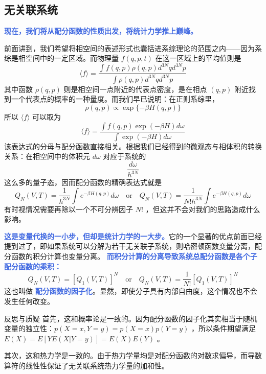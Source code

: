\subsection{无关联系统}
\textcolor{RoyalBlue}{\textbf{\kaishu 现在，我们将从配分函数的性质出发，将统计力学推上巅峰。}}

前面讲到，我们希望将相空间的表述形式也囊括进系综理论的范围之内——因为系综是相空间中的一定区域。而物理量 $f(q,p,t)$ 在这一区域上的平均值则是
\begin{equation}
    \langle f\rangle=\frac{\displaystyle\int f(q, p) \rho(q, p) d^{3 N} q d^{3 N} p}{\displaystyle\int \rho(q, p) d^{3 N} q d^{3 N} p}
\end{equation}
其中函数 $\rho(q,p)$ 则是相空间一点附近的代表点密度，是在相点 $(q,p)$ 附近找到一个代表点的概率的一种量度。而我们早已说明：在正则系综里，
\begin{equation}
    \rho(q, p) \propto \exp \{-\beta H(q, p)\}
\end{equation}
所以 $\langle f \rangle$ 可以取为
\begin{equation}
    \langle f\rangle=\frac{\displaystyle\int f(q, p) \exp (-\beta H) d \omega}{\displaystyle\int \exp (-\beta H) d \omega}
\end{equation}
该表达式的分母与配分函数直接相关。根据我们已经得到的微观态与相体积的转换关系：在相空间中的体积元 $d\omega$ 对应于系统的
\[
    \frac{d\omega}{h^{3N}} 
\]
这么多的量子态，因而配分函数的精确表达式就是
\begin{equation}\label{equ:phaseintegrate}
    Q_N(V, T)=\frac{1}{ h^{3 N}} \int e^{-\beta H(q, p)} d \omega\quad\text{or}\quad Q_N(V, T)=\frac{1}{N! h^{3 N}} \int e^{-\beta H(q, p)} d \omega
\end{equation}
有时视情况需要再除以一个不可分辨因子 $N!$ ，但这并不会对我们的思路造成什么影响。

\textcolor{RoyalBlue}{\textbf{\kaishu 这是变量代换的一小步，但却是统计力学的一大步。}}它的一个显著的优点前面已经提到过了，即如果系统可以分解为若干无关联子系统，则哈密顿函数变量分离，配分函数的积分计算也变量分离。 \textcolor{RoyalBlue}{\textbf{\kaishu  而积分计算的分离导致系统总配分函数是各个子配分函数的乘积：}}
\begin{equation}\label{equ:yinzihua}
    Q_N(V, T)=\left[Q_1(V, T)\right]^N \quad\text{or}\quad Q_N(V, T)=\frac{1}{N !}\left[Q_1(V, T)\right]^N
\end{equation}
这也叫做 \textcolor{RoyalBlue}{\textbf{\kaishu 配分函数的因子化}}。显然，即使分子具有内部自由度，这个情况也不会发生任何改变。

\begin{justification}{\kaishu 反思与质疑}
\kaishu \fontsize{11pt}{16pt}
    \quad\quad 首先，这和概率论是一致的。因为配分函数的因子化其实相当于随机变量的独立性：$p(X = x, Y = y) = p(X = x)p(Y = y)$ ，所以条件期望满足 $E(X) = E[YE(X|Y = y)] = E(X)E(Y)$ 。

    \quad\quad 其次，这和热力学是一致的。由于热力学量均是对配分函数的对数求偏导，而导数算符的线性性保证了无关联系统热力学量的加和性。
\end{justification}

